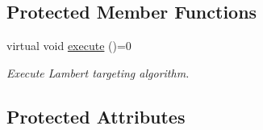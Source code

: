 \subsection*{Protected Member Functions}
\begin{DoxyCompactItemize}
\item 
virtual void \hyperlink{classtudat_1_1mission__segments_1_1LambertTargeter_ac022ab6c8aa0d941b1d049036a7d8054}{execute} ()=0
\begin{DoxyCompactList}\small\item\em Execute Lambert targeting algorithm. \end{DoxyCompactList}\end{DoxyCompactItemize}
\subsection*{Protected Attributes}
